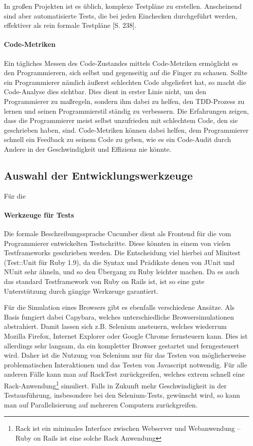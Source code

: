 In großen Projekten ist es üblich, komplexe Testpläne zu erstellen. Anscheinend sind aber automatisierte Tests, die bei jeden Einchecken durchgeführt werden, effektiver als rein formale Testpläne \citep{hunt_pragmatic_1999}[S. 238].

\paragraph{Code-Metriken} Ein tägliches Messen des Code-Zustandes mittels Code-Metriken ermöglicht es den Programmierern, sich selbst und gegenseitig auf die Finger zu schauen. Sollte ein Programmierer nämlich äußerst schlechten Code abgeliefert hat, so macht die Code-Analyse dies sichtbar. Dies dient in erster Linie nicht, um den Programmierer zu maßregeln, sondern ihm dabei zu helfen, den TDD-Prozess zu lernen und seinen Programmierstil ständig zu verbessern. Die Erfahrungen zeigen, dass die Programmierer meist selbst unzufrieden mit schlechtem Code, den sie geschrieben haben, sind. Code-Metriken können dabei helfen, dem Programmierer schnell ein Feedback zu seinem Code zu geben, wie es ein Code-Audit durch Andere in der Geschwindigkeit und Effizienz nie könnte.





\subsection{Auswahl der Entwicklungswerkzeuge}

Für die 

\paragraph{Werkzeuge für Tests} Die formale Beschreibungssprache Cucumber dient als Frontend für die vom Programmierer entwickelten Testschritte. Diese könnten in einem von vielen Testframeworks geschrieben werden. Die Entscheidung viel hierbei auf Minitest (Test::Unit für Ruby 1.9), da die Syntax und Prädikate denen von JUnit und NUnit sehr ähneln, und so den Übergang zu Ruby leichter machen. Da es auch das standard Testframework von Ruby on Rails ist, ist so eine gute Unterstützung durch gängige Werkzeuge garantiert.

Für die Simulation eines Browsers gibt es ebenfalls verschiedene Ansätze. Als Basis fungiert dabei Capybara, welches unterschiedliche Browsersimulationen abstrahiert. Damit lassen sich z.B. Selenium ansteuern, welches wiederrum Mozilla Firefox, Internet Explorer oder Google Chrome fernsteuern kann. Dies ist allerdings sehr langsam, da ein kompletter Browser gestartet und ferngesteuert wird. Daher ist die Nutzung von Selenium nur für das Testen von möglicherweise problematischen Interaktionen und das Testen von Javascript notwendig. Für alle anderen Fälle kann man auf RackTest zurückgreifen, welches extrem schnell eine Rack-Anwendung\footnote{Rack ist ein minimales Interface zwischen Webserver und Webanwendung -- Ruby on Rails ist eine solche Rack Anwendung} simuliert.
Falls in Zukunft mehr Geschwindigkeit in der Testausführung, insbesondere bei den Selenium-Tests, gewünscht wird, so kann man auf Parallelisierung auf mehreren Computern zurückgreifen.

